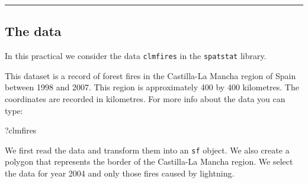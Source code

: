 \documentclass[
  letterpaper,
  DIV=11,
  numbers=noendperiod]{scrartcl}
\newenvironment{Shaded}{\begin{snugshade}}{\end{snugshade}}
\newcommand{\NormalTok}[1]{\textcolor[rgb]{0.00,0.23,0.31}{#1}}
\begin{document}
\begin{center}\rule{0.5\linewidth}{0.5pt}\end{center}

\subsection{The data}\label{the-data-2}

In this practical we consider the data \texttt{clmfires} in the
\texttt{spatstat} library.

This dataset is a record of forest fires in the Castilla-La Mancha
region of Spain between 1998 and 2007. This region is approximately 400
by 400 kilometres. The coordinates are recorded in kilometres. For more
info about the data you can type:

\begin{Shaded}
\begin{Highlighting}[]
\NormalTok{?clmfires}
\end{Highlighting}
\end{Shaded}

We first read the data and transform them into an \texttt{sf} object. We
also create a polygon that represents the border of the Castilla-La
Mancha region. We select the data for year 2004 and only those fires
caused by lightning.
\end{document}
